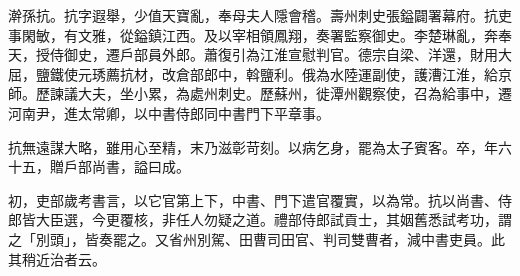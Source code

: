 \begin{pinyinscope}
 澣孫抗。抗字遐舉，少值天寶亂，奉母夫人隱會稽。壽州刺史張鎰闢署幕府。抗吏事閑敏，有文雅，從鎰鎮江西。及以宰相領鳳翔，奏署監察御史。李楚琳亂，奔奉天，授侍御史，遷戶部員外郎。蕭復引為江淮宣慰判官。德宗自梁、洋還，財用大屈，鹽鐵使元琇薦抗材，改倉部郎中，斡鹽利。俄為水陸運副使，護漕江淮，給京師。歷諫議大夫，坐小累，為處州刺史。歷蘇州，徙潭州觀察使，召為給事中，遷河南尹，進太常卿，以中書侍郎同中書門下平章事。



 抗無遠謀大略，雖用心至精，末乃滋彰苛刻。以病乞身，罷為太子賓客。卒，年六十五，贈戶部尚書，謚曰成。



 初，吏部歲考書言，以它官第上下，中書、門下遣官覆實，以為常。抗以尚書、侍郎皆大臣選，今更覆核，非任人勿疑之道。禮部侍郎試貢士，其姻舊悉試考功，謂之「別頭」，皆奏罷之。又省州別駕、田曹司田官、判司雙曹者，減中書吏員。此其稍近治者云。



\end{pinyinscope}